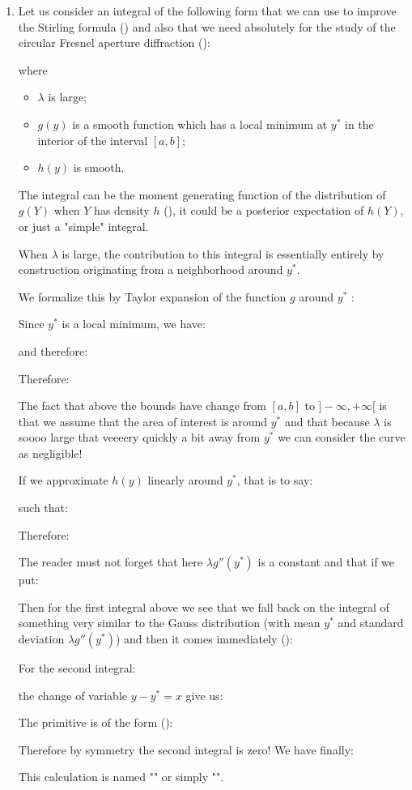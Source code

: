 \begin{enumerate}
		\item Let us consider an integral of the following form that we can use to improve the Stirling formula () and also that we need absolutely for the study of the circular Fresnel aperture diffraction ():
		
		where
		\begin{itemize}
			\item $\lambda$ is large;
			\item $g(y)$ is a smooth function which has a local minimum at $y^*$ in the interior of the interval $[a, b]$;
			\item $h(y)$ is smooth.
		\end{itemize}
		The integral can be the moment generating function of the
		distribution of $g(Y)$ when $Y$ has density $h$ (), it could be a posterior expectation of $h(Y)$, or just a "simple" integral.
		
		When $\lambda$ is large, the contribution to this integral is essentially entirely by construction originating from a neighborhood around $y^*$.
		
		We formalize this by Taylor expansion of the function $g$ around $y^*$ :
		
		Since $y^*$ is a local minimum, we have:
		
		 and therefore:
		
		Therefore:
		
		The fact that above the bounds have change from $[a,b]$ to $]-\infty,+\infty[$ is that we assume that the area of interest is around $y^*$ and that because $\lambda$ is soooo large that veeeery quickly a bit away from $y^*$ we can consider the curve as negligible!
		
		If we approximate $h(y)$ linearly around $y^*$, that is to say:
		
		such that:
		
		Therefore:
		
		The reader must not forget that here $\lambda g''(y^*)$ is a constant and that if we put:
		
		Then for the first integral above we see that we fall back on the integral of something very similar to the Gauss distribution (with mean $y^*$ and standard deviation $\lambda g''(y^*)$) and then it comes immediately ():
		
		For the second integral:
		
		the change of variable $y-y^*=x$ give us:
		
		The primitive is of the form ():
		
		Therefore by symmetry the second integral is zero! We have finally:
		
		This calculation is named "" or simply "".
	\end{enumerate}
	
